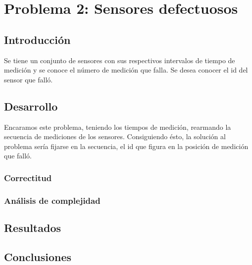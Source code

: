 \section{Problema 2: Sensores defectuosos}

\subsection{Introducci\'on}

\quad Se tiene un conjunto de sensores con sus respectivos intervalos de tiempo de medici\'on y se conoce el n\'umero de medici\'on que falla. Se desea conocer el id del sensor que fall\'o. 

\subsection{Desarrollo}

\quad Encaramos este problema, teniendo los tiempos de medici\'on, rearmando la secuencia de mediciones de los sensores. Consiguiendo \'esto, la soluci\'on al problema ser\'ia fijarse en la secuencia, el id que figura en la posici\'on de medici\'on que fall\'o.

\quad 

\subsubsection{Correctitud}

\subsubsection{An\'alisis de complejidad}

\subsection{Resultados}

\subsection{Conclusiones}
